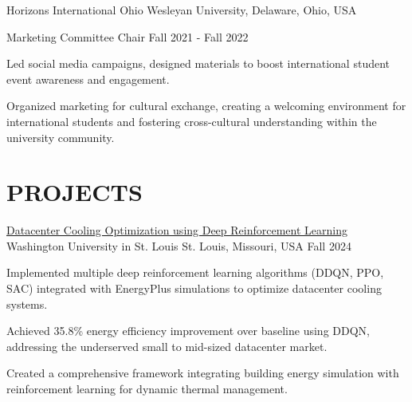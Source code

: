 \documentclass[10pt, letterpaper]{article}
\begin{document}
\begin{leadershipentry}
    {Horizons International} %
    {Ohio Wesleyan University, Delaware, Ohio, USA} %
    \begin{positionentry}
        {Marketing Committee Chair} %
        {Fall 2021 - Fall 2022} %
        \item Led social media campaigns, designed materials to boost international student event awareness and engagement.
        \item Organized marketing for cultural exchange, creating a welcoming environment for international students and fostering cross-cultural understanding within the university community.
    \end{positionentry}
\end{leadershipentry}

\vspace{\headerSpacing}

\section{PROJECTS}

\begin{projectentry}
    {\href{https://github.com/agopalareddy/CSE510A_Datacenter_Cooling}{Datacenter Cooling Optimization using Deep Reinforcement Learning}} %
    {Washington University in St. Louis} %
    {St. Louis, Missouri, USA} %
    {Fall 2024} %
    \item Implemented multiple deep reinforcement learning algorithms (DDQN, PPO, SAC) integrated with EnergyPlus simulations to optimize datacenter cooling systems.
    \item Achieved 35.8\% energy efficiency improvement over baseline using DDQN, addressing the underserved small to mid-sized datacenter market.
    \item Created a comprehensive framework integrating building energy simulation with reinforcement learning for dynamic thermal management.
\end{projectentry}
\end{document}
